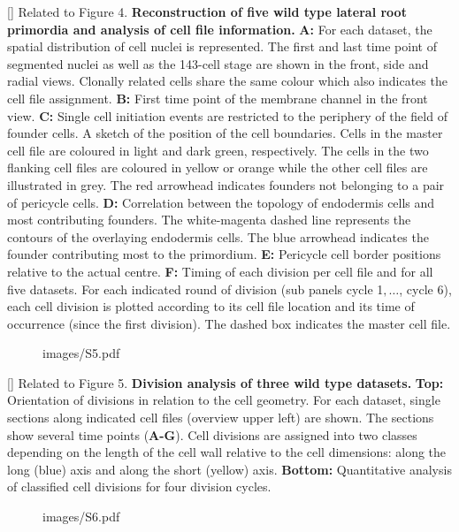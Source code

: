 []{
Related to Figure 4.
{\bf Reconstruction of five wild type lateral root primordia and analysis of cell file information.} {\bf A:} For each dataset, the spatial distribution of cell nuclei is represented. The first and last time point of segmented nuclei as well as the 143-cell stage are shown in the front, side and radial views. Clonally related cells share the same colour which also indicates the cell file assignment. {\bf B:} First time point of the membrane channel in the front view. {\bf C:} Single cell initiation events are restricted to the periphery of the field of founder cells. A sketch of the position of the cell boundaries. Cells in the master cell file are coloured in light and dark green, respectively. The cells in the two flanking cell files are coloured in yellow or orange while the other cell files are illustrated in grey. The red arrowhead indicates founders not belonging to a pair of pericycle cells. {\bf D:} Correlation between the topology of endodermis cells and most contributing founders. The white-magenta dashed line represents the contours of the overlaying endodermis cells. The blue arrowhead indicates the founder contributing most to the primordium. {\bf E:} Pericycle cell border positions relative to the actual centre. {\bf F:} Timing of each division per cell file and for all five datasets. For each indicated round of division (sub panels cycle 1$, \ldots$, cycle 6), each cell division is plotted according to its cell file location and its time of occurrence (since the first division). The dashed box indicates the master cell file.
}
\label{fig:S4}
%
\clearpage
%
\begin{figure}[htbp]
\centering
	\begin{overpic}[width=1.\linewidth]{images/S5.pdf}
	\end{overpic}
\end{figure}
\clearpage
{}[]{
Related to Figure 5.
{\bf Division analysis of three wild type datasets.} {\bf Top:} Orientation of divisions in relation to the cell geometry. For each dataset, single sections along indicated cell files (overview upper left) are shown. The sections show several time points (\textbf{A-G}). Cell divisions are assigned into two classes depending on the length of the cell wall relative to the cell dimensions: along the long (blue) axis and along the short (yellow) axis. {\bf Bottom:} Quantitative analysis of classified cell divisions for four division cycles.
}
\label{fig:S5}
%
\clearpage
%
\begin{figure}[htbp]
\centering
	\begin{overpic}[width=0.8\linewidth]{images/S6.pdf}
	\end{overpic}
\end{figure}
